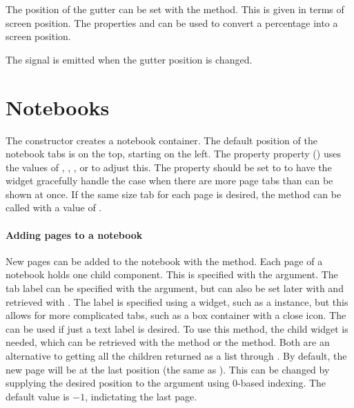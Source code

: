The position of the gutter can be set with the
 method. This is given in terms of
screen position. The
properties  and  can be used to
convert a percentage into a screen position.

The  signal is emitted when the gutter position is
changed. 



\section{Notebooks}
\label{sec:RGtk2:gtkNotebook}

The  constructor creates a notebook container. The
default position of the notebook tabs is on the top, starting on the
left. The property  property
() uses the 
values of , , , or  to adjust this. The
property  should be set to  to have the
widget gracefully handle the case when there are more page tabs than
can be shown at once. If the same size tab for each page is desired,
the method  can be called with
a value of . 


\paragraph{Adding pages to a notebook}
New pages can be added to the notebook with the
 method. Each page of a notebook holds
one child component. This is specified with the
 argument. The tab label can be
specified with the 
argument, but can also be set later with
 and retrieved with
. The label is specified using a
widget, such as a  instance, but this allows for
more complicated tabs, such as a box container with a close icon. The
 can be used if just a text label
is desired. To use this method, the child widget is needed, which can
be retrieved with the
\method{[[}{GObject}
method or the  method. Both are an
alternative to getting all the children returned as a list through
. By default, the new page will be
at the last position (the same as
). This can be changed by supplying
the desired position to the argument
 using $0$-based indexing.
The default value is $-1$, indictating the last page.


